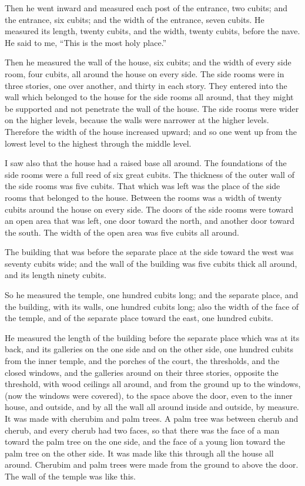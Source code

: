  Then he went inward and measured each post of the entrance,
two cubits; and the entrance, six cubits; and the width of the entrance,
seven cubits.  He measured its length, twenty cubits, and
the width, twenty cubits, before the nave. He said to me, ``This is the
most holy place.''

 Then he measured the wall of the house, six cubits; and the
width of every side room, four cubits, all around the house on every
side.  The side rooms were in three stories, one over
another, and thirty in each story. They entered into the wall which
belonged to the house for the side rooms all around, that they might be
supported and not penetrate the wall of the house.  The side
rooms were wider on the higher levels, because the walls were narrower
at the higher levels. Therefore the width of the house increased upward;
and so one went up from the lowest level to the highest through the
middle level.

 I saw also that the house had a raised base all around. The
foundations of the side rooms were a full reed of six great cubits.
 The thickness of the outer wall of the side rooms was five
cubits. That which was left was the place of the side rooms that
belonged to the house.  Between the rooms was a width of
twenty cubits around the house on every side.  The doors of
the side rooms were toward an open area that was left, one door toward
the north, and another door toward the south. The width of the open area
was five cubits all around.

 The building that was before the separate place at the
side toward the west was seventy cubits wide; and the wall of the
building was five cubits thick all around, and its length ninety cubits.

 So he measured the temple, one hundred cubits long; and
the separate place, and the building, with its walls, one hundred cubits
long;  also the width of the face of the temple, and of the
separate place toward the east, one hundred cubits.

 He measured the length of the building before the separate
place which was at its back, and its galleries on the one side and on
the other side, one hundred cubits from the inner temple, and the
porches of the court,  the thresholds, and the closed
windows, and the galleries around on their three stories, opposite the
threshold, with wood ceilings all around, and from the ground up to the
windows, (now the windows were covered),  to the space
above the door, even to the inner house, and outside, and by all the
wall all around inside and outside, by measure.  It was
made with cherubim and palm trees. A palm tree was between cherub and
cherub, and every cherub had two faces,  so that there was
the face of a man toward the palm tree on the one side, and the face of
a young lion toward the palm tree on the other side. It was made like
this through all the house all around.  Cherubim and palm
trees were made from the ground to above the door. The wall of the
temple was like this.

